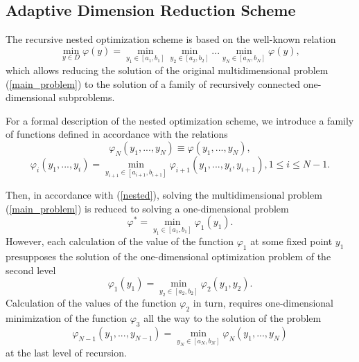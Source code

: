 \documentclass[entropy,article,submit,moreauthors,pdftex]{Definitions/mdpi}
\begin{document}
\subsection{Adaptive Dimension Reduction Scheme}

The recursive nested optimization scheme is based on the well-known relation  \cite{Grishagin2001} 
\begin{equation}\label{nested}
\min_{y \in D}\varphi(y) = \min_{y_1\in\left[a_1,b_1\right]}\min_{y_2\in\left[a_2,b_2\right]}...\min_{y_N\in\left[a_N,b_N\right]}\varphi(y),
\end{equation}
which allows reducing the solution of the original multidimensional problem (\ref{main_problem}) to the solution of a family of recursively connected one-dimensional subproblems.

For a formal description of the nested optimization scheme, we introduce a family of functions defined in accordance with the relations
\begin{equation}\label{nested_N}
\varphi_N(y_1,...,y_N) \equiv \varphi(y_1,...,y_N),
\end{equation}
\begin{equation}\label{nested_i}
\varphi_i(y_1,...,y_i) = \min_{ y_{i+1} \in\left[a_{i+1},b_{i+1}\right]} \varphi_{i+1}(y_1,...,y_i,y_{i+1}), 1\leq i\leq N-1.
\end{equation}

Then, in accordance with  (\ref{nested}), solving the multidimensional problem  (\ref{main_problem}) is reduced to solving a one-dimensional problem 
\begin{equation}\label{nested_1}
\varphi^* = \min_{y_1\in\left[a_1,b_1\right]}\varphi_1(y_1).
\end{equation}
However, each calculation of the value of the function $\varphi_1$ at some fixed point $y_1$ presupposes the solution of the one-dimensional optimization problem of the second level
\begin{equation}
\varphi_1(y_1) = \min_{y_2\in\left[a_2,b_2\right]}\varphi_2(y_1,y_2).
\end{equation}
Calculation of the values of the function  $\varphi_2$ in turn, requires one-dimensional minimization of the function  $\varphi_3$ all the way to the solution of the problem
\begin{equation}
\varphi_{N-1}(y_1,...,y_{N-1}) = \min_{ y_{N} \in\left[a_{N},b_{N}\right]} \varphi_{N}(y_1,...,y_{N})
\end{equation}
at the last level of recursion.
\end{document}
